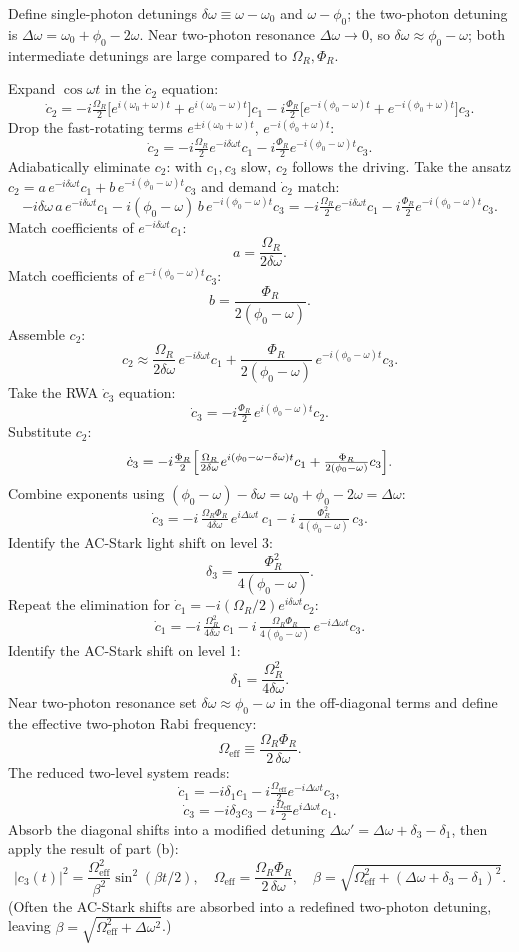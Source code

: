 \documentclass[11pt]{article}
\begin{document}
Define single-photon detunings $\delta\omega\equiv\omega-\omega_0$ and $\omega-\phi_0$; the two-photon detuning is $\Delta\omega = \omega_0+\phi_0-2\omega$. Near two-photon resonance $\Delta\omega\to 0$, so $\delta\omega\approx \phi_0-\omega$; both intermediate detunings are large compared to $\Omega_R,\Phi_R$.

Expand $\cos\omega t$ in the $\dot c_2$ equation:
\[
\dot c_2 = -i\tfrac{\Omega_R}{2}\bigl[e^{i(\omega_0+\omega)t}+e^{i(\omega_0-\omega)t}\bigr]c_1 -i\tfrac{\Phi_R}{2}\bigl[e^{-i(\phi_0-\omega)t}+e^{-i(\phi_0+\omega)t}\bigr]c_3.
\]
Drop the fast-rotating terms $e^{\pm i(\omega_0+\omega)t}$, $e^{-i(\phi_0+\omega)t}$:
\[
\dot c_2 = -i\tfrac{\Omega_R}{2}e^{-i\delta\omega t}c_1 - i\tfrac{\Phi_R}{2}e^{-i(\phi_0-\omega)t}c_3.
\]
Adiabatically eliminate $c_2$: with $c_1, c_3$ slow, $c_2$ follows the driving. Take the ansatz $c_2 = a\,e^{-i\delta\omega t}c_1 + b\,e^{-i(\phi_0-\omega)t}c_3$ and demand $\dot c_2$ match:
\[
-i\delta\omega\,a\,e^{-i\delta\omega t}c_1 -i(\phi_0-\omega)\,b\,e^{-i(\phi_0-\omega)t}c_3 = -i\tfrac{\Omega_R}{2}e^{-i\delta\omega t}c_1 - i\tfrac{\Phi_R}{2}e^{-i(\phi_0-\omega)t}c_3.
\]
Match coefficients of $e^{-i\delta\omega t}c_1$:
\[
a = \frac{\Omega_R}{2\delta\omega}.
\]
Match coefficients of $e^{-i(\phi_0-\omega)t}c_3$:
\[
b = \frac{\Phi_R}{2(\phi_0-\omega)}.
\]
Assemble $c_2$:
\[
c_2 \approx \frac{\Omega_R}{2\delta\omega}\,e^{-i\delta\omega t}c_1 + \frac{\Phi_R}{2(\phi_0-\omega)}\,e^{-i(\phi_0-\omega)t}c_3.
\]
Take the RWA $\dot c_3$ equation:
\[
\dot c_3 = -i\tfrac{\Phi_R}{2}\,e^{i(\phi_0-\omega)t}c_2.
\]
Substitute $c_2$:
\[
\dot c_3 = -i\tfrac{\Phi_R}{2}\Bigl[\tfrac{\Omega_R}{2\delta\omega}e^{i(\phi_0-\omega-\delta\omega)t}c_1 + \tfrac{\Phi_R}{2(\phi_0-\omega)}c_3\Bigr].
\]
Combine exponents using $(\phi_0-\omega)-\delta\omega = \omega_0+\phi_0-2\omega = \Delta\omega$:
\[
\dot c_3 = -i\,\tfrac{\Omega_R\Phi_R}{4\delta\omega}\,e^{i\Delta\omega t}\,c_1 - i\,\tfrac{\Phi_R^2}{4(\phi_0-\omega)}\,c_3.
\]
Identify the AC-Stark light shift on level 3:
\[
\delta_3 = \frac{\Phi_R^2}{4(\phi_0-\omega)}.
\]
Repeat the elimination for $\dot c_1 = -i(\Omega_R/2)e^{i\delta\omega t}c_2$:
\[
\dot c_1 = -i\,\tfrac{\Omega_R^2}{4\delta\omega}\,c_1 - i\,\tfrac{\Omega_R\Phi_R}{4(\phi_0-\omega)}\,e^{-i\Delta\omega t}c_3.
\]
Identify the AC-Stark shift on level 1:
\[
\delta_1 = \frac{\Omega_R^2}{4\delta\omega}.
\]
Near two-photon resonance set $\delta\omega\approx \phi_0-\omega$ in the off-diagonal terms and define the effective two-photon Rabi frequency:
\[
\Omega_\text{eff} \equiv \frac{\Omega_R\Phi_R}{2\,\delta\omega}.
\]
The reduced two-level system reads:
\[
\dot c_1 = -i\delta_1 c_1 - i\tfrac{\Omega_\text{eff}}{2}e^{-i\Delta\omega t}c_3,
\]
\[
\dot c_3 = -i\delta_3 c_3 - i\tfrac{\Omega_\text{eff}}{2}e^{i\Delta\omega t}c_1.
\]
Absorb the diagonal shifts into a modified detuning $\Delta\omega' = \Delta\omega + \delta_3 - \delta_1$, then apply the result of part (b):
\[
\boxed{\;|c_3(t)|^2 = \frac{\Omega_\text{eff}^2}{\beta^2}\sin^2(\beta t/2),\quad
\Omega_\text{eff}=\frac{\Omega_R\Phi_R}{2\,\delta\omega},\quad
\beta = \sqrt{\Omega_\text{eff}^2 + (\Delta\omega + \delta_3-\delta_1)^2}.\;}
\]
(Often the AC-Stark shifts are absorbed into a redefined two-photon detuning, leaving $\beta=\sqrt{\Omega_\text{eff}^2+\Delta\omega^2}$.)
\end{document}
